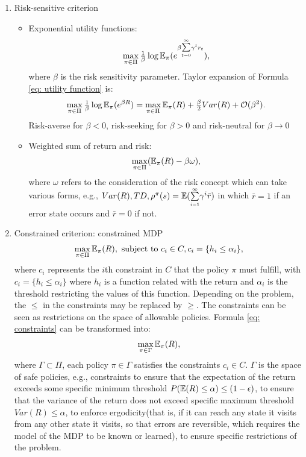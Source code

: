 \begin{enumerate}
\item
	Risk-sensitive criterion
	\begin{itemize}
	\item
            	Exponential utility functions:
            	\begin{align}
            	\max_{\pi \in \Pi} {\textstyle \frac{1}{\beta}}\log{\mathbb{E}_{\pi}(e^{\beta {\textstyle \sum\limits_{\scriptscriptstyle t=0}^{\scriptscriptstyle \infty}} \gamma^t r_t})}, \label{eq: utility function}
            	\end{align}
            	where $\beta$ is the risk sensitivity parameter. Taylor expansion of  Formula \ref{eq: utility function} is:
            	\begin{align}
            	\max_{\pi \in \Pi} {\textstyle \frac{1}{\beta}}\log{\mathbb{E}_{\pi}(e^{\beta R})} = \max_{\pi \in \Pi}\mathbb{E}_{\pi}(R) + {\textstyle \frac{\beta}{2}}Var(R) + \mathcal{O}(\beta^2).
            	\end{align}
            	Risk-averse for $\beta < 0$, risk-seeking for $\beta > 0$ and risk-neutral for $\beta \rightarrow 0$
	\item
		Weighted sum of return and risk:
		\begin{align}
            	\max_{\pi \in \Pi} (\mathbb{E}_{\pi}(R) - \beta \omega),
            	\end{align}
	where $\omega$ refers to the consideration of the risk concept which can take various forms, e.g., $Var(R), TD, \rho^{\pi}(s) = \mathbb{E}({\textstyle \sum\limits_{\scriptscriptstyle i=1}^{\scriptscriptstyle \infty}}\gamma^i \bar{r})$ in which $\bar{r} = 1$ if an error state occurs and $\bar{r} = 0$  if not.
        \end{itemize}
\item
 	Constrained criterion: constrained MDP \citep{Altman_1999}
	\begin{align}
            	\max_{\pi \in \Pi} \mathbb{E}_{\pi}(R), \mathrm{~ subject ~ to ~} c_i \in C, c_i = \{h_i \leq \alpha_i\}, \label{eq: constraints}
         \end{align}
         where $c_i$ represents the $i$th constraint in $C$ that the policy $\pi$ must fulfill, with $c_i = \{h_i \leq \alpha_i\}$ where $h_i$ is a function related with the return and $\alpha_i$ is the threshold restricting the values of this function. Depending on the problem, the $\leq$ in the constraints may be replaced by $\geq$. The constraints can be seen as restrictions on the space of allowable policies. Formula \ref{eq: constraints} can be transformed into:
         \begin{align}
            	\max_{\pi \in \Gamma} \mathbb{E}_{\pi}(R), 
         \end{align}
         where $\Gamma \subset \Pi$, each policy $\pi \in \Gamma$ satisfies the constraints $c_i \in C$. $\Gamma$ is the space of safe policies, e.g., constraints to ensure that the expectation of the return exceeds some specific minimum threshold $P (\mathbb{E}(R) \leq \alpha) \leq (1 - \epsilon)$, to ensure that the variance of the return does not exceed specific maximum threshold $V ar(R) \leq \alpha $, to enforce ergodicity(that is, if it can reach any state it visits from any other state it visits, so that errors are reversible, which requires the model of the MDP to be known or learned),  to ensure specific restrictions of the problem.
         

\end{enumerate}
